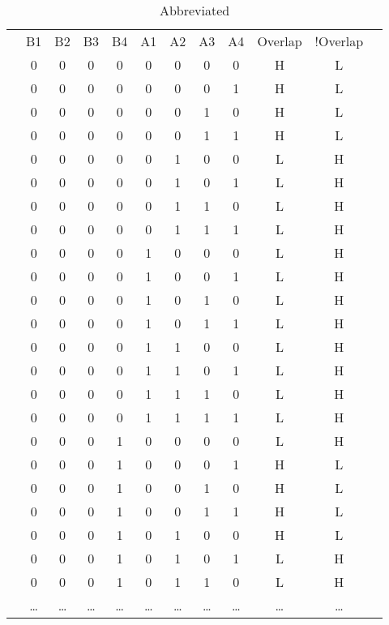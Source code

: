 \documentclass[letterpaper,titlepage,oneside]{article}
\begin{document}
\begin{table}['h']
\begin{center}
\begin{tabular}{c|c|c|c|c|c|c|c|c|c|c|c}
\cline{2-11}

 & B1 & B2 & B3 & B4 & A1 & A2 & A3 & A4 & Overlap & !Overlap & \\ \cline{2-11}
 & 0 & 0 & 0 & 0 & 0 & 0 & 0 & 0 & H & L &   \\
 & 0 & 0 & 0 & 0 & 0 & 0 & 0 & 1 & H & L &   \\
 & 0 & 0 & 0 & 0 & 0 & 0 & 1 & 0 & H & L &   \\
 & 0 & 0 & 0 & 0 & 0 & 0 & 1 & 1 & H & L &   \\
 & 0 & 0 & 0 & 0 & 0 & 1 & 0 & 0 & L & H &   \\
 & 0 & 0 & 0 & 0 & 0 & 1 & 0 & 1 & L & H &   \\
 & 0 & 0 & 0 & 0 & 0 & 1 & 1 & 0 & L & H &   \\
 & 0 & 0 & 0 & 0 & 0 & 1 & 1 & 1 & L & H &   \\
 & 0 & 0 & 0 & 0 & 1 & 0 & 0 & 0 & L & H &   \\
 & 0 & 0 & 0 & 0 & 1 & 0 & 0 & 1 & L & H &   \\
 & 0 & 0 & 0 & 0 & 1 & 0 & 1 & 0 & L & H &   \\
 & 0 & 0 & 0 & 0 & 1 & 0 & 1 & 1 & L & H &   \\
 & 0 & 0 & 0 & 0 & 1 & 1 & 0 & 0 & L & H &   \\
 & 0 & 0 & 0 & 0 & 1 & 1 & 0 & 1 & L & H &   \\
 & 0 & 0 & 0 & 0 & 1 & 1 & 1 & 0 & L & H &   \\
 & 0 & 0 & 0 & 0 & 1 & 1 & 1 & 1 & L & H &   \\
 & 0 & 0 & 0 & 1 & 0 & 0 & 0 & 0 & L & H &   \\
 & 0 & 0 & 0 & 1 & 0 & 0 & 0 & 1 & H & L &   \\
 & 0 & 0 & 0 & 1 & 0 & 0 & 1 & 0 & H & L &   \\
 & 0 & 0 & 0 & 1 & 0 & 0 & 1 & 1 & H & L &   \\
 & 0 & 0 & 0 & 1 & 0 & 1 & 0 & 0 & H & L &   \\
 & 0 & 0 & 0 & 1 & 0 & 1 & 0 & 1 & L & H &   \\
 & 0 & 0 & 0 & 1 & 0 & 1 & 1 & 0 & L & H &   \\
 & \ldots & \ldots & \ldots & \ldots & \ldots & \ldots & \ldots & \ldots & \ldots & \ldots &  \\

\cline{2-11}
\end{tabular}
\caption{Abbreviated}\label{table:OverLap_Unminimized}

\end{center}
\end{table}
\end{document}

